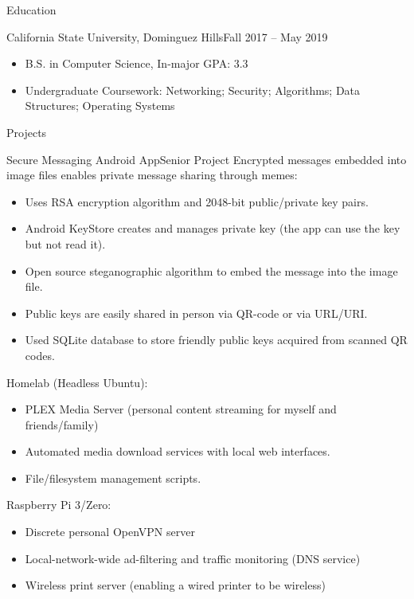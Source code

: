 \documentclass[]{mcdowellcv}
\begin{document}
	\makeheader
	
	\begin{cvsection}{Education}
		\begin{cvsubsection}[2]{California State University, Dominguez Hills}{}{Fall 2017 -- May 2019}
			\begin{itemize}
				\item B.S. in Computer Science, In-major GPA: 3.3
				\item Undergraduate Coursework: Networking; Security; Algorithms; Data Structures; Operating Systems
			\end{itemize}
		\end{cvsubsection}
	\end{cvsection}

	\begin{cvsection}{Projects}
		\begin{cvsubsection}{Secure Messaging Android App}{}{Senior Project}
			Encrypted messages embedded into image files enables private message sharing through memes: 
			\begin{itemize}
				\item Uses RSA encryption algorithm and 2048-bit public/private key pairs.
				\item Android KeyStore creates and manages private key (the app can use the key but not read it).
				\item Open source steganographic algorithm to embed the message into the image file.
				\item Public keys are easily shared in person via QR-code or via URL/URI.
				\item Used SQLite database to store friendly public keys acquired from scanned QR codes.
			\end{itemize}
		\end{cvsubsection}
		
		\begin{cvsubsection}{Homelab (Headless Ubuntu):}{}{}
			\begin{itemize}
				\item PLEX Media Server (personal content streaming for myself and friends/family)
				\item Automated media download services with local web interfaces.
				\item File/filesystem management scripts.
			\end{itemize}
		\end{cvsubsection}
		\begin{cvsubsection}{Raspberry Pi 3/Zero:}{}{}
			\begin{itemize}
				\item Discrete personal OpenVPN server
				\item Local-network-wide ad-filtering and traffic monitoring (DNS service)
				\item Wireless print server (enabling a wired printer to be wireless)
			\end{itemize}
		\end{cvsubsection}
		

\end{cvsection}
\end{document}
